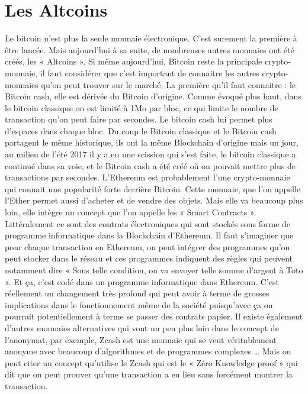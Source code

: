 \documentclass{bredele} %
\begin{document}
    \section*{Les Altcoins}
    Le bitcoin n’est plus la seule monnaie électronique. C’est surement la première à être lancée. Mais aujourd’hui à sa suite, de nombreuses autres monnaies ont été créés, les « Altcoins ». Si même aujourd’hui, Bitcoin reste la principale crypto-monnaie, il faut considérer que c’est important de connaitre les autres crypto-monnaies qu’on peut trouver sur le marché.
    \newline
    \newline
    La première qu’il faut connaitre : le Bitcoin cash, elle est dérivée du Bitcoin d’origine. Comme évoqué plus haut, dans le bitcoin classique on est limité à 1Mo par bloc, ce qui limite le nombre de transaction qu’on peut faire par secondes. Le bitcoin cash lui permet plus d’espaces dans chaque bloc. Du coup le Bitcoin classique et le Bitcoin cash partagent le même historique, ils ont la même Blockchain d’origine mais un jour, au milieu de l’été 2017 il y a eu une scission qui s’est faite, le bitcoin classique a continué dans sa voie, et le Bitcoin cash a été créé où on pouvait mettre plus de transactions par secondes.
    \newline
    \newline
    L’Ethereum est probablement l’une crypto-monnaie qui connait une popularité forte derrière Bitcoin. Cette monnaie, que l’on appelle l’Ether permet aussi d’acheter et de vendre des objets. Mais elle va beaucoup plus loin, elle intègre un concept que l’on appelle les « Smart Contracts ». Littéralement ce sont des contrats électroniques qui sont stockés sous forme de programme informatique dans la Blockchain d’Ethereum.
    \newline
    Il faut s’imaginer que pour chaque transaction en Ethereum, on peut intégrer des programmes qu’on peut stocker dans le réseau et ces programmes indiquent des règles qui peuvent notamment dire « Sous telle condition, on va envoyer telle somme d’argent à Toto ». Et ça, c’est codé dans un programme informatique dans Ethereum. C’est réellement un changement très profond qui peut avoir à terme de grosses implications dans le fonctionnement même de la société puisqu’avec ça on pourrait potentiellement à terme se passer des contrats papier.
    \newline
    \newline
    Il existe également d’autres monnaies alternatives qui vont un peu plus loin dans le concept de l’anonymat, par exemple, Zcash est une monnaie qui se veut véritablement anonyme avec beaucoup d’algorithmes et de programmes complexes …  Mais on peut citer un concept qu’utilise le Zcash qui est le « Zéro Knowledge proof » qui dit que on peut prouver qu’une transaction a eu lieu sans forcément montrer la transaction.
\end{document}
